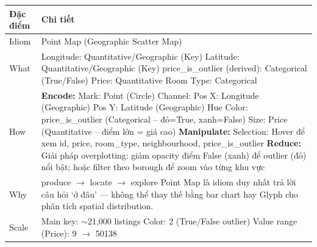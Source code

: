 \begin{longtable}{|p{2.8cm}|p{11.5cm}|}
\hline
\textbf{Đặc điểm} & \textbf{Chi tiết} \\
\hline
\endhead
\hline
\endfoot
Idiom & Point Map (Geographic Scatter Map) \\
\hline
What & Longitude: Quantitative/Geographic (Key) \newline
Latitude: Quantitative/Geographic (Key) \newline
price\_is\_outlier (derived): Categorical (True/False) \newline
Price: Quantitative \newline
Room Type: Categorical \\
\hline
How & \textbf{Encode:} \newline
\newline
Mark: Point (Circle) \newline
Channel: \newline
\hspace{0.3cm} Pos X: Longitude (Geographic) \newline
\hspace{0.3cm} Pos Y: Latitude (Geographic) \newline
\hspace{0.3cm} Hue Color: price\_is\_outlier (Categorical -- đỏ=True, xanh=False) \newline
\hspace{0.3cm} Size: Price (Quantitative -- điểm lớn = giá cao) \newline
\newline
\textbf{Manipulate:} \newline
\newline
Selection: Hover để xem id, price, room\_type, neighbourhood, price\_is\_outlier \newline
\newline
\textbf{Reduce:} \newline
\newline
Giải pháp overplotting: giảm opacity điểm False (xanh) để outlier (đỏ) nổi bật; hoặc filter theo borough để zoom vào từng khu vực \\
\hline
Why & produce $\rightarrow$ locate $\rightarrow$ explore \newline
Point Map là idiom duy nhất trả lời câu hỏi `ở đâu' --- không thể thay thế bằng bar chart hay Glyph cho phân tích spatial distribution. \\
\hline
Scale & Main key: $\sim$21,000 listings \newline
Color: 2 (True/False outlier) \newline
Value range (Price): 9 $\rightarrow$ 50138 \\
\hline
\end{longtable}

